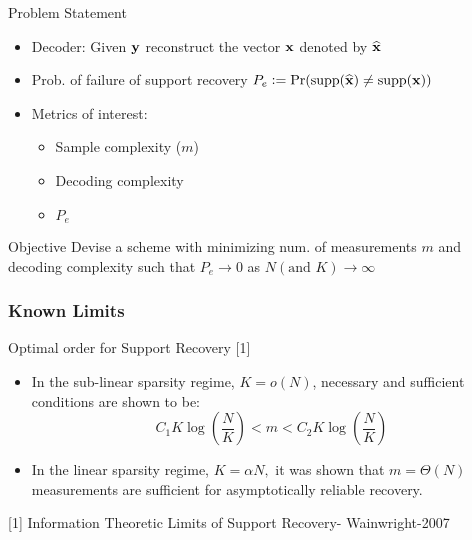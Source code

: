 \begin{frame}{Problem Statement}
\begin{itemize}
\item Decoder: Given $\mathbf{y}$ reconstruct the vector $\mathbf{x}$ denoted by $\widehat{\mathbf{x}}$
\item Prob. of failure of support recovery $P_e\mathrel{\mathop:}= \text{Pr}(\text{supp}(\widehat{\mathbf{x}})\neq \text{supp}(\mathbf{x}))$
\item Metrics of interest:
\begin{itemize}
\item Sample complexity ($m$)
\item Decoding complexity
\item $P_e$
\end{itemize} 
\end{itemize}
\vspace{5ex}

\begin{block}{Objective}
Devise a scheme with minimizing num. of measurements $m$ and decoding complexity such that $P_e\rightarrow 0$ as $N (\text{and } K) \rightarrow \infty$
\end{block}
\end{frame}
\begin{frame}\frametitle{Known Limits}
\begin{block}{Optimal order for Support Recovery [1]}
\begin{itemize}
\item In the sub-linear sparsity regime, $K=o(N)$, necessary and sufficient conditions are shown to be:
\begin{equation*}
C_1 K\log\left(\frac{N}{K}\right)<m<C_2 K\log\left(\frac{N}{K}\right)
\end{equation*}
\item In the linear sparsity regime, $K=\alpha N,$ it was shown that $m=\Theta(N)$ measurements are sufficient for asymptotically reliable recovery. 
 \end{itemize}
\end{block}
\vspace{7ex}


[1] Information Theoretic Limits of Support Recovery- Wainwright-2007
\end{frame}

